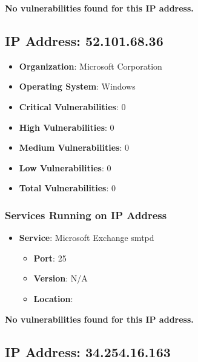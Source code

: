 \documentclass{article}
\begin{document}
\textbf{No vulnerabilities found for this IP address.}




\clearpage



\subsection{IP Address: 52.101.68.36}

\begin{itemize}
    \item \textbf{Organization}: Microsoft Corporation
    \item \textbf{Operating System}:  Windows 
    \item \textbf{Critical Vulnerabilities}: 0
    \item \textbf{High Vulnerabilities}: 0
    \item \textbf{Medium Vulnerabilities}: 0
    \item \textbf{Low Vulnerabilities}: 0
    \item \textbf{Total Vulnerabilities}: 0
\end{itemize}

\subsubsection*{Services Running on IP Address}

\begin{itemize}
    
        \item \textbf{Service}: Microsoft Exchange smtpd
        \begin{itemize}
            \item \textbf{Port}: 25
            \item \textbf{Version}:  N/A 
            \item \textbf{Location}: \href{  }{  }
        \end{itemize}
    
\end{itemize}


\textbf{No vulnerabilities found for this IP address.}




\clearpage



\subsection{IP Address: 34.254.16.163}
\end{document}
